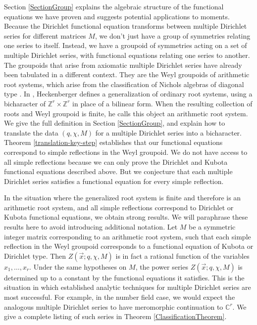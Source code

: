 \documentclass[11pt,letterpaper]{article}
\newenvironment{manualtheorem}[1]{%
  \IfBlankTF{#1}
    {\renewcommand{\themanualtheoreminner}{\unskip}}
    {\renewcommand\themanualtheoreminner{#1}}%
  \manualtheoreminner
}{\endmanualtheoreminner}
\theoremstyle{definition}
\theoremstyle{remark}
\numberwithin{equation}{section}
\theoremstyle{dotless}
\newcommand{\C}{\mathbb{C}}
\newcommand{\Z}{\mathbb{Z}}
\begin{document}
Section \ref{SectionGroup} explains the algebraic structure of the functional equations we have proven and suggests potential applications to moments. Because the Dirichlet functional equation transforms between multiple Dirichlet series for different matrices $M$, we don't just have a group of symmetries relating one series to itself. Instead, we have a groupoid of symmetries acting on a set of multiple Dirichlet series, with functional equations relating one series to another. The groupoids that arise from axiomatic multiple Dirichlet series have already been tabulated in a different context. They are the Weyl groupoids of arithmetic root systems, which arise from the classification of Nichols algebras of diagonal type \cite{HeckenbergerClassification, HeckenbergerRank2}. In \cite{HeckenbergerRank2}, Heckenberger defines a generalization of ordinary root systems, using a bicharacter of $\Z^r \times \Z^r$ in place of a bilinear form. When the resulting collection of roots and Weyl groupoid is finite, he calls this object an arithmetic root system. We give the full definition in Section \ref{SectionGroup}, and explain how to translate the data $(q, \chi, M)$ for a multiple Dirichlet series into a bicharacter. Theorem \ref{translation-key-step} establishes that our functional equations correspond to simple reflections in the Weyl groupoid. We do not have access to all simple reflections because we can only prove the Dirichlet and Kubota functional equations described above. But we conjecture that each multiple Dirichlet series satisfies a functional equation for every simple reflection. 

In the situation where the generalized root system is finite and therefore is an arithmetic root system, and all simple reflections correspond to Dirichlet or Kubota functional equations, we obtain strong results. We will paraphrase these results here to avoid introducing additional notation. 
\begin{manualtheorem}{\ref{rational-fn}} Let $M$ be a symmetric integer matrix corresponding to an arithmetic root system, such that each simple reflection in the Weyl groupoid corresponds to a functional equation of Kubota or Dirichlet type. Then $Z ( \vec{x}; q, \chi, M) $ is in fact a rational function of the variables $x_1,\dots,x_r$.
\end{manualtheorem}
\begin{manualtheorem}{\ref{uniquely-determined}} Under the same hypotheses on $M$, the power series $Z ( \vec{x}; q, \chi, M) $ is determined up to a constant by the functional equations it satisfies. 
\end{manualtheorem}
\noindent This is the situation in which established analytic techniques for multiple Dirichlet series are most successful. For example, in the number field case, we would expect the analogous multiple Dirichlet series to have meromorphic continuation to $\C^r$. We give a complete listing of such series in Theorem \ref{ClassificationTheorem}.
\end{document}

